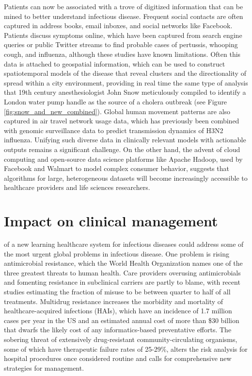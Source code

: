 Patients can now be associated with a trove of digitized information that can be mined to better understand infectious disease. Frequent social contacts are often captured in address books, email inboxes, and social networks like Facebook. Patients discuss symptoms online, which have been captured from search engine queries\autocite{Ginsberg2009} or public Twitter streams to find probable cases of pertussis, whooping cough, and influenza,\autocite{Nagel2013} although these studies have known limitations.\autocite{Lazer2014} Often this data is attached to geospatial information, which can be used to construct spatiotemporal models of the disease that reveal clusters and the directionality  of spread within a city environment,\autocite{Nagar2014} providing in real time the same type of analysis that 19th century anesthesiologist John Snow meticulously compiled to identify a London water pump handle as the source of a cholera outbreak (see Figure \ref{fig:snow_and_new_combined}).\autocite{Buechner2004,Snow1855} Global human movement patterns are also captured in air travel network usage data, which has previously been combined with genomic surveillance data to predict transmission dynamics of H3N2 influenza.\autocite{Lemey2014} Unifying such diverse data in clinically relevant models with actionable outputs remains a significant challenge. On the other hand, the advent of cloud computing and open-source data science platforms like Apache Hadoop, used by Facebook and Walmart to model complex consumer behavior, suggests that algorithms for large, heterogeneous datasets will become increasingly accessible to healthcare providers and life sciences researchers.\autocite{Mohammed2014}

\section{Impact on clinical management}

 of a new learning healthcare system for infectious diseases could address some of the most urgent global problems in infectious disease. One problem is rising antimicrobial resistance, which the World Health Organization names one of the three greatest threats to human health.\autocite{Policy2010} Care providers overusing antimicrobials and fomenting resistance in subclinical carriers are partly to blame, with recent studies estimating the fraction of misuse to be between quarter to half of all treatments.\autocite{McKellar2014} Multidrug resistance increases the morbidity and mortality of healthcare-acquired infections (HAIs), which have an incidence of 1.7 million cases per year in the US and an estimated annual cost of more than \$30 billion \autocite{Scott2009} that dwarfs the likely cost of any informatics-based preventative efforts. The sobering threat of extensively drug-resistant community-circulating organisms, some of which have therapeutic failure rates of 25-29\%,\autocite{Hirsch2010} alters the risk analysis for hospital procedures once considered routine and calls for comprehensive new strategies for management.

